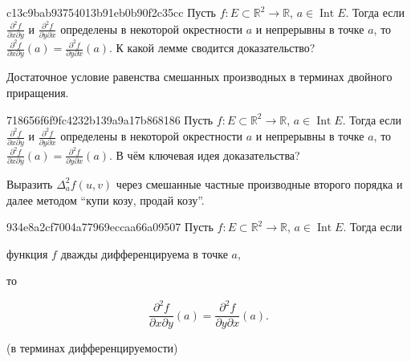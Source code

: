 \begin{note}{c13c9bab93754013b91eb0b90f2c35cc}
    Пусть \({ f : E \subset \mathbb R^2 \to \mathbb R }\),\: \({ a \in \operatorname{Int} E }\).
    Тогда если \({ \frac{\partial^2  f}{\partial x \partial y} }\) и \({ \frac{\partial^2 f}{\partial y \partial x} }\) определены в некоторой окрестности \({ a }\) и непрерывны в точке \({ a }\),
    то \({ \frac{\partial^2 f}{\partial x \partial y}(a) = \frac{\partial^2 f}{\partial y \partial x}(a) }\).
    К какой лемме сводится доказательство?

    \begin{cloze}{1}
        Достаточное условие равенства смешанных производных в терминах двойного приращения.
    \end{cloze}
\end{note}

\begin{note}{718656f6f9fc4232b139a9a17b868186}
    Пусть \({ f : E \subset \mathbb R^2 \to \mathbb R }\),\: \({ a \in \operatorname{Int} E }\).
    Тогда если \({ \frac{\partial^2  f}{\partial x \partial y} }\) и \({ \frac{\partial^2 f}{\partial y \partial x} }\) определены в некоторой окрестности \({ a }\) и непрерывны в точке \({ a }\),
    то \({ \frac{\partial^2 f}{\partial x \partial y}(a) = \frac{\partial^2 f}{\partial y \partial x}(a) }\).
    В чём ключевая идея доказательства?

    \begin{cloze}{1}
        Выразить \({ \Delta_{a}^2 f(u, v) }\) через смешанные частные производные второго порядка и далее методом ``купи козу, продай козу''.
    \end{cloze}
\end{note}

\begin{note}{934e8a2cf7004a77969eccaa66a09507}
    Пусть \({ f : E \subset \mathbb R^2 \to \mathbb R }\),\: \({ a \in \operatorname{Int} E }\).
    Тогда если \begin{icloze}{1}функция \({ f }\) дважды дифференцируема в точке \({ a }\),\end{icloze}
    то
    \begin{icloze}{2}
        \[
            \frac{\partial^2 f}{\partial x \partial y}(a) = \frac{\partial^2 f}{\partial y \partial x}(a).
        \]
    \end{icloze}

    \begin{center}
        \tiny
        (в терминах дифференцируемости)
    \end{center}
\end{note}


